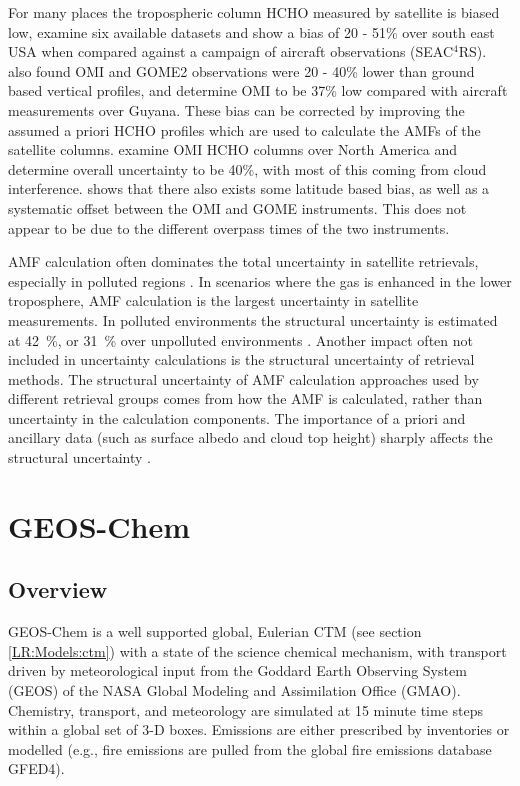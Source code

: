     For many places the tropospheric column HCHO measured by satellite is biased low, \textcite{Zhu2016} examine six available datasets and show a bias of 20 - 51\% over south east USA when compared against a campaign of aircraft observations (SEAC$^4$RS).
    \textcite{DeSmedt2015} also found OMI and GOME2 observations were 20 - 40\% lower than ground based vertical profiles, and \textcite{Barkley2013} determine OMI to be 37\% low compared with aircraft measurements over Guyana.
    These bias can be corrected by improving the assumed a priori HCHO profiles which are used to calculate the AMFs of the satellite columns.
    \textcite{Millet2006} examine OMI HCHO columns over North America and determine overall uncertainty to be 40\%, with most of this coming from cloud interference.
    \textcite{Millet2008} shows that there also exists some latitude based bias, as well as a systematic offset between the OMI and GOME instruments.
    This does not appear to be due to the different overpass times of the two instruments.
    
    AMF calculation often dominates the total uncertainty in satellite retrievals, especially in polluted regions \parencite{Lorente2017}.
    In scenarios where the gas is enhanced in the lower troposphere, AMF calculation is the largest uncertainty in satellite measurements.
    In polluted environments the structural uncertainty is estimated at 42~\%, or 31~\% over unpolluted environments \parencite{Lorente2017}.
    Another impact often not included in uncertainty calculations is the structural uncertainty of retrieval methods.
    The structural uncertainty of AMF calculation approaches used by different retrieval groups comes from how the AMF is calculated, rather than uncertainty in the calculation components.
    The importance of a priori and ancillary data (such as surface albedo and cloud top height) sharply affects the structural uncertainty \parencite{Lorente2017}.
    
\section{GEOS-Chem}
  \label{Model:GC}

  \subsection{Overview}
    GEOS-Chem is a well supported global, Eulerian CTM (see section \ref{LR:Models:ctm}) with a state of the science chemical mechanism, with transport driven by meteorological input from the Goddard Earth Observing System (GEOS) of the NASA Global Modeling and Assimilation Office (GMAO).
    Chemistry, transport, and meteorology are simulated at 15 minute time steps within a global set of 3-D boxes.
    Emissions are either prescribed by inventories or modelled (e.g., fire emissions are pulled from the global fire emissions database GFED4).
    
